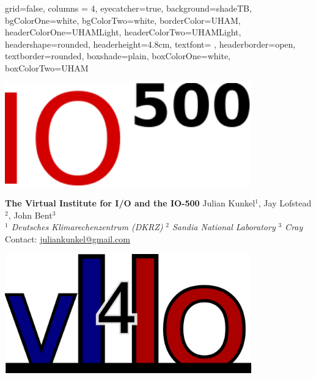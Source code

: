 \documentclass[portrait,a0paper,fontscale=0.4]{baposter}
\begin{document}



\begin{poster}
{ %
  grid=false,
  columns = 4,
  eyecatcher=true,
  background=shadeTB,%
  bgColorOne=white,
  bgColorTwo=white,
  borderColor=UHAM,
  headerColorOne=UHAMLight,
  headerColorTwo=UHAMLight,%
  headershape=rounded,
  headerheight=4.8cm,
  textfont={\setlength{\parindent}{0em} \setlength{\parskip}{0.75em}},
  headerborder=open,
  textborder=rounded,
  boxshade=plain,%
  boxColorOne=white,
  boxColorTwo=UHAM
}{ %
  \begin{minipage}{0.2\textwidth}
   \begin{center}
    \includegraphics[width=0.8\textwidth]{logo-io500.pdf}
   \end{center}
  \end{minipage}

}{ %
  \textbf{The Virtual Institute for I/O and the IO-500}
}{ %
  \vspace{0.5em}
  \textsc
  Julian Kunkel$^1$, Jay Lofstead$^2$, John Bent$^3$
  \\[0.5em]
  \emph{$^1$ Deutsches Klimarechenzentrum (DKRZ)}
  \hspace*{2em}
  \emph{$^2$ Sandia National Laboratory}
   \hspace*{2em}
  \emph{$^3$ Cray}
  \\[0.5em]
   Contact: \url{juliankunkel@gmail.com}
}{
    \begin{minipage}{0.2\textwidth}
     \begin{center}
      \includegraphics[width=0.8\textwidth]{logo-vi4io.png}
     \end{center}
    \end{minipage}
}



\end{poster}
\end{document}
